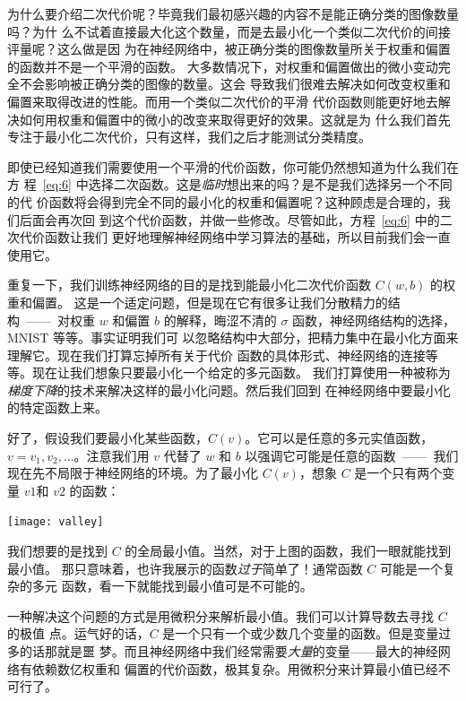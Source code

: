 为什么要介绍二次代价呢？毕竟我们最初感兴趣的内容不是能正确分类的图像数量吗？为什
么不试着直接最大化这个数量，而是去最小化一个类似二次代价的间接评量呢？这么做是因
为在神经网络中，被正确分类的图像数量所关于权重和偏置的函数并不是一个平滑的函数。
大多数情况下，对权重和偏置做出的微小变动完全不会影响被正确分类的图像的数量。这会
导致我们很难去解决如何改变权重和偏置来取得改进的性能。而用一个类似二次代价的平滑
代价函数则能更好地去解决如何用权重和偏置中的微小的改变来取得更好的效果。这就是为
什么我们首先专注于最小化二次代价，只有这样，我们之后才能测试分类精度。

即使已经知道我们需要使用一个平滑的代价函数，你可能仍然想知道为什么我们在方
程~\eqref{eq:6} 中选择二次函数。这是\emph{临时}想出来的吗？是不是我们选择另一个不同的代
价函数将会得到完全不同的最小化的权重和偏置呢？这种顾虑是合理的，我们后面会再次回
到这个代价函数，并做一些修改。尽管如此，方程~\eqref{eq:6} 中的二次代价函数让我们
更好地理解神经网络中学习算法的基础，所以目前我们会一直使用它。

重复一下，我们训练神经网络的目的是找到能最小化二次代价函数 $C(w,b)$ 的权重和偏置。
这是一个适定问题，但是现在它有很多让我们分散精力的结构~——~对权重 $w$ 和偏置 $b$
的解释，晦涩不清的 $\sigma$ 函数，神经网络结构的选择，MNIST 等等。事实证明我们可
以忽略结构中大部分，把精力集中在最小化方面来理解它。现在我们打算忘掉所有关于代价
函数的具体形式、神经网络的连接等等。现在让我们想象只要最小化一个给定的多元函数。
我们打算使用一种被称为\emph{梯度下降}的技术来解决这样的最小化问题。然后我们回到
在神经网络中要最小化的特定函数上来。

好了，假设我们要最小化某些函数，$C(v)$。它可以是任意的多元实值函数，$v = v_1,
v_2, \ldots$。注意我们用 $v$ 代替了 $w$ 和 $b$ 以强调它可能是任意的函数~——~我们
现在先不局限于神经网络的环境。为了最小化 $C(v)$，想象 $C$ 是一个只有两个变量
$v1$和 $v2$ 的函数：
\begin{center}
  \texttt{[image: valley]}
\end{center}

我们想要的是找到 $C$ 的全局最小值。当然，对于上图的函数，我们一眼就能找到最小值。
那只意味着，也许我展示的函数\emph{过于}简单了！通常函数 $C$ 可能是一个复杂的多元
函数，看一下就能找到最小值可是不可能的。

一种解决这个问题的方式是用微积分来解析最小值。我们可以计算导数去寻找 $C$ 的极值
点。运气好的话，$C$ 是一个只有一个或少数几个变量的函数。但是变量过多的话那就是噩
梦。而且神经网络中我们经常需要\emph{大量}的变量——最大的神经网络有依赖数亿权重和
偏置的代价函数，极其复杂。用微积分来计算最小值已经不可行了。


